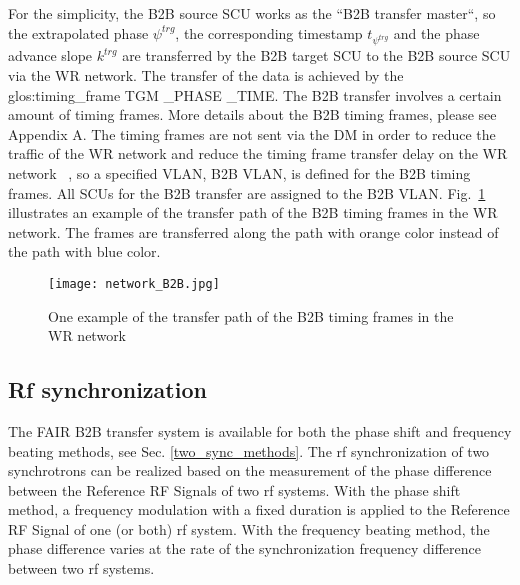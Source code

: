 For the simplicity, the B2B source SCU works as the ``B2B transfer master``, so the extrapolated phase $\psi^\mathit{trg}$, the corresponding timestamp $t_{\psi^\mathit{trg}}$ and the phase advance slope $k^\mathit{trg}$ are transferred by the B2B target SCU to the B2B source SCU via the WR network. The transfer of the data is achieved by the \gls{glos:timing_frame} TGM \_PHASE \_TIME. The B2B transfer involves a certain amount of timing frames. More details about the B2B timing frames, please see Appendix A. The timing frames are not sent via the DM in order to reduce the traffic of the WR network and reduce the timing frame transfer delay on the WR network ~\cite{bai_concept_2016}, so a specified VLAN, B2B \gls{VLAN}, is defined for the B2B timing frames. All SCUs for the B2B transfer are assigned to the B2B VLAN. Fig.~\ref{network_B2B} illustrates an example of the transfer path of the B2B timing frames in the WR network. The frames are transferred along the path with orange color instead of the path with blue color. 
 \begin{figure}[!htb]
   \centering   
   \texttt{[image: network\_B2B.jpg]}
   \caption{One example of the transfer path of the B2B timing frames in the WR network}
   \label{network_B2B}
\end{figure}
\subsection{Rf synchronization}
The FAIR B2B transfer system is available for both the phase shift and frequency beating methods, see Sec. \ref{two_sync_methods}. The rf synchronization of two synchrotrons can be realized based on the measurement of the phase difference between the Reference RF Signals of two rf systems. With the phase shift method, a frequency modulation with a fixed duration is applied to the Reference RF Signal of one (or both) rf system. With the frequency beating method, the phase difference varies at the rate of the synchronization frequency difference between two rf systems. 

